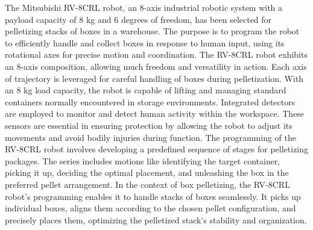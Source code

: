 The Mitsubishi RV-8CRL robot, an 8-axis industrial robotic system with a payload capacity of 8 kg and 6 degrees of freedom, has been selected for pelletizing stacks of boxes in a warehouse. The purpose is to program the robot to efficiently handle and collect boxes in response to human input, using its rotational axes for precise motion and coordination. The RV-8CRL robot exhibits an 8-axis composition, allowing much freedom and versatility in action. Each axis of trajectory is leveraged for careful handling of boxes during pelletization. With an 8 kg load capacity, the robot is capable of lifting and managing standard containers normally encountered in storage environments. Integrated detectors are employed to monitor and detect human activity within the workspace. These sensors are essential in ensuring protection by allowing the robot to adjust its movements and avoid bodily injuries during function. The programming of the RV-8CRL robot involves developing a predefined sequence of stages for pelletizing packages. The series includes motions like identifying the target container, picking it up, deciding the optimal placement, and unleashing the box in the preferred pellet arrangement. In the context of box pelletizing, the RV-8CRL robot's programming enables it to handle stacks of boxes seamlessly. It picks up individual boxes, aligns them according to the chosen pellet configuration, and precisely places them, optimizing the pelletized stack's stability and organization.